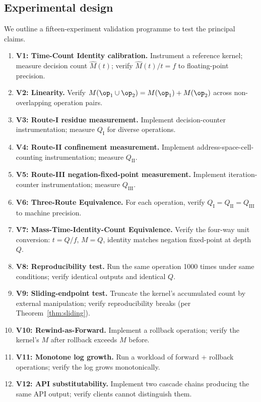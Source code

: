 \documentclass[twocolumn,11pt,a4paper]{article}
\newcommand{\Mcount}{M}
\newcommand{\Qweight}{Q}
\begin{document}
\subsection{Experimental design}

We outline a fifteen-experiment validation programme to test the principal claims.

\begin{enumerate}[nosep,leftmargin=*]
\item \textbf{V1: Time-Count Identity calibration.} Instrument a reference kernel; measure decision count $\hat{\Mcount}(t)$; verify $\hat{\Mcount}(t)/t = f$ to floating-point precision.
\item \textbf{V2: Linearity.} Verify $\Mcount(\op_1 \cup \op_2) = \Mcount(\op_1) + \Mcount(\op_2)$ across non-overlapping operation pairs.
\item \textbf{V3: Route-I residue measurement.} Implement decision-counter instrumentation; measure $\Qweight_\mathrm{I}$ for diverse operations.
\item \textbf{V4: Route-II confinement measurement.} Implement address-space-cell-counting instrumentation; measure $\Qweight_\mathrm{II}$.
\item \textbf{V5: Route-III negation-fixed-point measurement.} Implement iteration-counter instrumentation; measure $\Qweight_\mathrm{III}$.
\item \textbf{V6: Three-Route Equivalence.} For each operation, verify $\Qweight_\mathrm{I} = \Qweight_\mathrm{II} = \Qweight_\mathrm{III}$ to machine precision.
\item \textbf{V7: Mass-Time-Identity-Count Equivalence.} Verify the four-way unit conversion: $t = \Qweight/f$, $\Mcount = \Qweight$, identity matches negation fixed-point at depth $\Qweight$.
\item \textbf{V8: Reproducibility test.} Run the same operation 1000 times under same conditions; verify identical outputs and identical $\Qweight$.
\item \textbf{V9: Sliding-endpoint test.} Truncate the kernel's accumulated count by external manipulation; verify reproducibility breaks (per Theorem~\ref{thm:sliding}).
\item \textbf{V10: Rewind-as-Forward.} Implement a rollback operation; verify the kernel's $\Mcount$ after rollback exceeds $\Mcount$ before.
\item \textbf{V11: Monotone log growth.} Run a workload of forward + rollback operations; verify the log grows monotonically.
\item \textbf{V12: API substitutability.} Implement two cascade chains producing the same API output; verify clients cannot distinguish them.

\end{enumerate}
\end{document}
